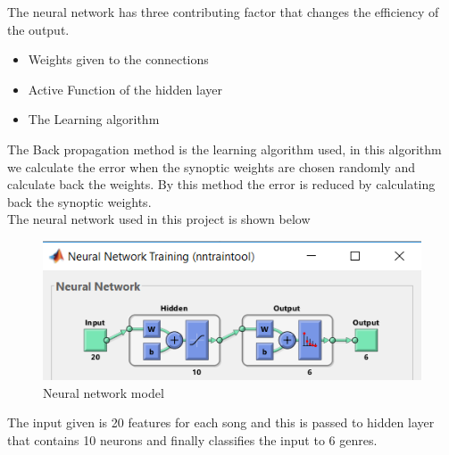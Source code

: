 \documentclass[12pt]{article}
\begin{document}
The neural network has three contributing factor that changes the efficiency of the output.
\begin{itemize}
  \item Weights given to the connections
  \item Active Function of the hidden layer
   \item The Learning algorithm
   \end{itemize}
 The Back propagation method is the learning algorithm used, in this algorithm we calculate the error when the synoptic weights are chosen randomly and calculate back the weights. By this method the error is reduced by calculating back the synoptic weights.\\
 The neural network used in this project is shown below
\begin{figure}[H]
\center
\includegraphics [scale=0.5]{neuralnet.png}
\caption{Neural network model}
\end{figure}
The input given is 20 features for each song and this is passed to hidden layer that contains 10 neurons and finally classifies the input to 6 genres.
\end{document}
